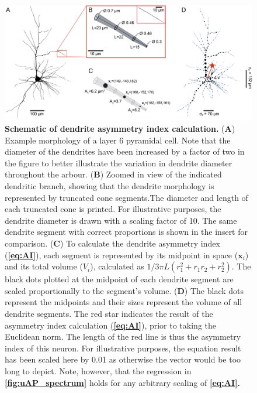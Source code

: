 \begin{figure}[h!]
    \centering
    \includegraphics[width=17cm]{Figures/chapter3/figureS7.png}
    \caption{\textbf{Schematic of dendrite asymmetry index calculation.} (\textbf{A}) Example morphology of a layer 6 pyramidal cell. Note that the diameter of the dendrites have been increased by a factor of two in the figure to better illustrate the variation in dendrite diameter throughout the arbour. (\textbf{B}) Zoomed in view of the indicated dendritic branch, showing that the dendrite morphology is represented by truncated cone segments.The diameter and length of each truncated cone is printed. For illustrative purposes, the dendrite diameter is drawn with a scaling factor of 10. The same dendrite segment with correct proportions is shown in the insert for comparison.  (\textbf{C}) To calculate the dendrite asymmetry index (\textbf{\ref{eq:AI}}), each segment is represented by its midpoint in space ($\bm{x}_i$) and its total volume ($V_i$), calculated as $1/3 \pi L (r_1^2 + r_1r_2 + r_2^2)$. The black dots plotted at the midpoint of each dendrite segment are scaled proportionally to the segment's volume. (\textbf{D}) The black dots represent the midpoints and their sizes represent the volume of all dendrite segments. The red star indicates the result of the asymmetry index calculation (\textbf{\ref{eq:AI}}), prior to taking the Euclidean norm. The length of the red line is thus the asymmetry index of this neuron. For illustrative purposes, the equation result has been scaled here by 0.01 as otherwise the vector would be too long to depict. Note, however, that the regression in \textbf{\autoref{fig:uAP_spectrum}} holds for any arbitrary scaling of \textbf{\ref{eq:AI}.}} 
    \label{fig:AI_fig}
\end{figure}

\clearpage

\renewcommand{\thetable}{\thechapter.\arabic{table}}
\setcounter{table}{0}

\renewcommand{\thefigure}{\thechapter.\arabic{figure}}
\renewcommand{\figurename}{Fig}
\setcounter{figure}{0}